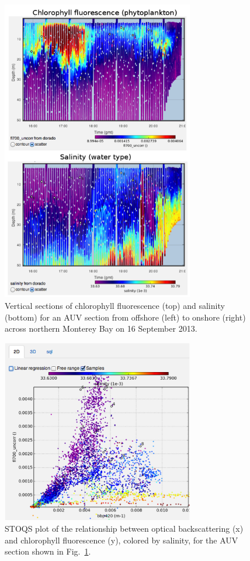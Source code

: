 \begin{figure}[htpb]
\centering
\includegraphics[width=3.3in]{JohnsFigureY.png}
\caption{Vertical sections of chlorophyll fluorescence (top) and salinity (bottom) for an AUV section from offshore (left) to onshore (right) across northern Monterey Bay on 16 September 2013.}
\label{fig:JohnsFigureY}
\end{figure}

\begin{figure}[htpb]
\centering
\includegraphics[width=3.3in]{JohnsFigureZ.png}
\caption{STOQS plot of the relationship between optical backscattering (x) and chlorophyll fluorescence (y), colored by salinity, for the AUV section shown in Fig.~\ref{fig:JohnsFigureY}.}
\label{fig:JohnsFigureZ}
\end{figure}

